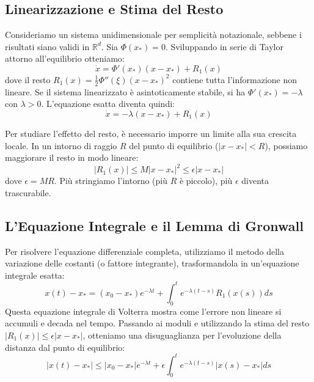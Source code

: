 \documentclass[12pt,a4paper]{article}
\begin{document}
\subsection{Linearizzazione e Stima del Resto}
Consideriamo un sistema unidimensionale per semplicità notazionale, sebbene i risultati siano validi in $\mathbb{R}^d$. Sia $\Phi(x_*) = 0$. Sviluppando in serie di Taylor attorno all'equilibrio otteniamo:
\begin{equation}
\dot{x} = \Phi'(x_*)(x - x_*) + R_1(x)
\end{equation}
dove il resto $R_1(x) = \frac{1}{2}\Phi''(\xi)(x-x_*)^2$ contiene tutta l'informazione non lineare. 
Se il sistema linearizzato è asintoticamente stabile, si ha $\Phi'(x_*) = -\lambda$ con $\lambda > 0$. L'equazione esatta diventa quindi:
\begin{equation}
\dot{x} = -\lambda(x - x_*) + R_1(x)
\end{equation}

Per studiare l'effetto del resto, è necessario imporre un limite alla sua crescita locale. In un intorno di raggio $R$ del punto di equilibrio ($|x - x_*| < R$), possiamo maggiorare il resto in modo lineare:
\begin{equation}
|R_1(x)| \le M |x - x_*|^2 \le \epsilon |x - x_*|
\end{equation}
dove $\epsilon = MR$. Più stringiamo l'intorno (più $R$ è piccolo), più $\epsilon$ diventa trascurabile.

\subsection{L'Equazione Integrale e il Lemma di Gronwall}
Per risolvere l'equazione differenziale completa, utilizziamo il metodo della variazione delle costanti (o fattore integrante), trasformandola in un'equazione integrale esatta:
\begin{equation}
x(t) - x_* = (x_0 - x_*)e^{-\lambda t} + \int_0^t e^{-\lambda(t-s)} R_1(x(s)) ds
\end{equation}
Questa equazione integrale di Volterra mostra come l'errore non lineare si accumuli e decada nel tempo. Passando ai moduli e utilizzando la stima del resto $|R_1(x)| \le \epsilon |x - x_*|$, otteniamo una disuguaglianza per l'evoluzione della distanza dal punto di equilibrio:
\begin{equation}
|x(t) - x_*| \le |x_0 - x_*|e^{-\lambda t} + \epsilon \int_0^t e^{-\lambda(t-s)} |x(s) - x_*| ds
\end{equation}
\end{document}
